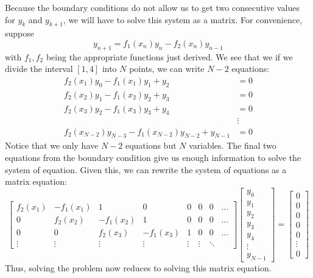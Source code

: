 \documentclass[]{article}
\theoremstyle{definition}
\numberwithin{equation}{section}
\begin{document}
	Because the boundary conditions do not allow us to get two consecutive values for $y_k$ and $y_{k+1}$, we will have to solve this system as a matrix. For convenience, suppose 
	\[
		y_{n+1} = f_1(x_n) y_{n} - f_2(x_n)y_{n-1}
	\]
	 with $f_1,f_2$ being the appropriate functions just derived. We see that we if we divide the interval $[1,4]$ into $N$ points, we can write $N-2$ equations:
	 \begin{align*}
	 	f_2(x_1)y_0-f_1(x_1) y_1 +y_2 &= 0 \\
	 	f_2(x_2)y_1-f_1(x_2) y_2  + y_3&=0 \\
	 	f_2(x_3)y_2 - f_1(x_3)y_3 + y_4 &= 0 \\
	 	&\vdots  \\
	 	f_2(x_{N-2})y_{N-3} - f_1(x_{N-2})y_{N-2} + y_{N-1} &= 0
	 \end{align*}
	 Notice that we only have $N-2$ equations but $N$ variables. The final two equations from the boundary condition give us enough information to solve the system of equation. Given this, we can rewrite the system of equations as a matrix equation:
	\[\begin{bmatrix}
		f_2(x_1) & -f_1(x_1) & 1 & 0 & 0 & 0 & 0 &\ldots \\
		0 & f_2(x_2) & -f_1(x_2) & 1 & 0 & 0 & 0 &\ldots \\
		0 & 0 & f_2(x_3) & -f_1(x_3) & 1 & 0 & 0 &\ldots \\
		\vdots & \vdots & \vdots & \vdots & \vdots & \vdots & \ddots
	\end{bmatrix}
	\begin{bmatrix}
	y_0 \\
	y_1 \\
	y_2 \\
	y_3 \\
	y_4 \\
	\vdots \\
	y_{N-1}
	\end{bmatrix}
	= \begin{bmatrix}
	0 \\
	0 \\
	0 \\
	0 \\
	0 \\
	\vdots \\
	0
	\end{bmatrix}
	\]  
	Thus, solving  the problem now reduces to solving this matrix equation. 
\end{document}

